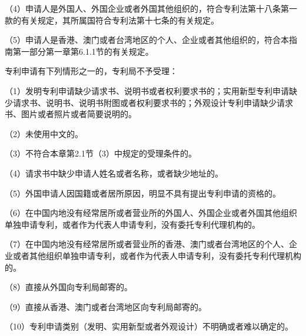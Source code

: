 {\setlength{\parindent}{17.1bp}（4）申请人是外国人、外国企业或者外国其他组织的，符合专利法第十八条第一款的有关规定，其所属国符合专利法第十七条的有关规定。\par}

{\setlength{\parindent}{17.1bp}（5）申请人是香港、澳门或者台湾地区的个人、企业或者其他组织的，符合本指南第一部分第一章第6.1.1节的有关规定。\par}

专利申请有下列情形之一的，专利局不予受理：

{\setlength{\parindent}{17.1bp}（1）发明专利申请缺少请求书、说明书或者权利要求书的；实用新型专利申请缺少请求书、说明书、说明书附图或者权利要求书的；外观设计专利申请缺少请求书、图片或者照片或者简要说明的。\par}

{\setlength{\parindent}{17.1bp}（2）未使用中文的。\par}

{\setlength{\parindent}{17.1bp}（3）不符合本章第2.1节（3）中规定的受理条件的。\par}

{\setlength{\parindent}{17.1bp}（4）请求书中缺少申请人姓名或者名称，或者缺少地址的。\par}

{\setlength{\parindent}{17.1bp}（5）外国申请人因国籍或者居所原因，明显不具有提出专利申请的资格的。\par}

{\setlength{\parindent}{17.1bp}（6）在中国内地没有经常居所或者营业所的外国人、外国企业或者外国其他组织单独申请专利，或者作为代表人申请专利，没有委托专利代理机构的。\par}

{\setlength{\parindent}{17.1bp}（7）在中国内地没有经常居所或者营业所的香港、澳门或者台湾地区的个人、企业或者其他组织单独申请专利，或者作为代表人申请专利，没有委托专利代理机构的。\par}

{\setlength{\parindent}{17.1bp}（8）直接从外国向专利局邮寄的。\par}

{\setlength{\parindent}{17.1bp}（9）直接从香港、澳门或者台湾地区向专利局邮寄的。\par}

{\setlength{\parindent}{17.1bp}（10）专利申请类别（发明、实用新型或者外观设计）不明确或者难以确定的。\par}

